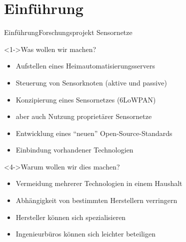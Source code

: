 \section{Einführung}

\begin{frame}{Einführung}{Forschungsprojekt Sensornetze}
		\begin{block}<1->{Was wollen wir machen?}
			\begin{itemize}
			\item<1-> 	Aufstellen eines Heimautomatisierungsservers
			\item<1-> 	Steuerung von Sensorknoten (aktive und passive)
			\item<2-> 	Konzipierung eines Sensornetzes (6LoWPAN)
			\item<2-> 	aber auch Nutzung proprietärer Sensornetze
			\item<3-> 	Entwicklung eines \enquote{neuen} Open-Source-Standards
			\item<3-> 	Einbindung vorhandener Technologien
			\end{itemize}
		\end{block}
		\begin{block}<4->{Warum wollen wir dies machen?}
			\begin{itemize}
			\item 	Vermeidung mehrerer Technologien in einem Haushalt
			\item 	Abhängigkeit von bestimmten Herstellern verringern 
			\item 	Hersteller können sich spezialisieren 
			\item 	Ingenieurbüros können sich leichter beteiligen
			\end{itemize}
		\end{block}
\end{frame}

